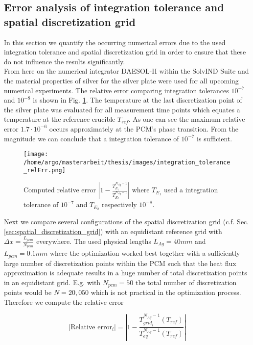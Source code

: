 \documentclass{scrartcl}[12pt, halfparskip]
\numberwithin{equation}{section}
\numberwithin{figure}{section}
\numberwithin{table}{section}
\begin{document}
\subsection{Error analysis of integration tolerance and spatial discretization grid}
In this section we quantify the occurring numerical errors due to the used integration tolerance and spatial discretization grid in order to ensure that these do not influence the results significantly. \\
From here on the numerical integrator DAESOL-II within the SolvIND Suite and the material properties of silver for the silver plate were used for all upcoming numerical experiments. The relative error comparing integration tolerances $10^{-7}$ and $10^{-8}$  is shown in Fig. \ref{fig:integration_tolerance_error}.
The temperature at the last discretization point of the silver plate was evaluated for all measurement time points which equates a temperature at the reference crucible $T_{ref}$. 
As one can see the maximum relative error $1.7 \cdot 10^{-6}$ occurs approximately at the PCM's phase transition. 
From the magnitude we can conclude that a integration tolerance of $10^{-7}$ is sufficient. \\


\begin{figure}[H]
	\centering
	\texttt{[image: /home/argo/masterarbeit/thesis/images/integration\_tolerance\_relErr.png]}
	\caption{Computed relative error $|1 - \frac{T^{N_{Ag}-1}_{E_1}}{T^{N_{Ag}-1}_{E_2}}|$ where $T_{E_1}$ used a integration tolerance of $10^{-7}$ and $T_{E_2}$ respectively $10^{-8}$.}
	\label{fig:integration_tolerance_error}
\end{figure}


Next we compare several configurations of the spatial discretization grid (c.f. Sec. \ref{sec:spatial_discretization_grid}) with an equidistant reference grid with $\Delta x = \frac{L_{pcm}}{N_{pcm}}$ everywhere. The used physical lengths $L_{Ag}=40mm$ and $L_{pcm}=0.1mm$ where the optimization worked best together with a sufficiently large number of discretization points within the PCM such that the heat flux approximation is adequate results in a huge number of total discretization points in an equidistant grid. E.g. with $N_{pcm}=50$ the total number of discretization points would be $N=20,050$ which is not practical in the optimization process. Therefore we compute the relative error

\begin{equation}
	| \text{Relative error}_i| = \left| 1 - \frac{T_{{grid}_i}^{N_{Ag}-1}(T_{ref})}{T_{eq}^{N_{Ag}-1}(T_{ref})} \right|
	\label{eq:relErr_grid}
\end{equation}
\end{document}
